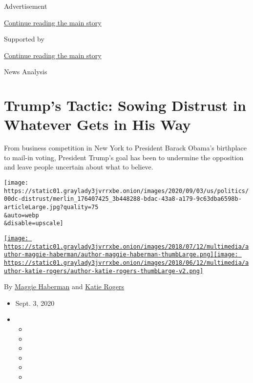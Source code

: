 Advertisement

\protect\hyperlink{after-top}{Continue reading the main story}

Supported by

\protect\hyperlink{after-sponsor}{Continue reading the main story}

News Analysis

\hypertarget{trumps-tactic-sowing-distrust-in-whatever-gets-in-his-way}{%
\section{Trump's Tactic: Sowing Distrust in Whatever Gets in His
Way}\label{trumps-tactic-sowing-distrust-in-whatever-gets-in-his-way}}

From business competition in New York to President Barack Obama's
birthplace to mail-in voting, President Trump's goal has been to
undermine the opposition and leave people uncertain about what to
believe.

\texttt{[image: https://static01.graylady3jvrrxbe.onion/images/2020/09/03/us/politics/00dc-distrust/merlin\_176407425\_3b448288-bdac-43a8-a179-9c63dba6598b-articleLarge.jpg?quality=75\\\&auto=webp\\\&disable=upscale]}

\href{https://www.nytimes3xbfgragh.onion/by/maggie-haberman}{\texttt{[image: https://static01.graylady3jvrrxbe.onion/images/2018/07/12/multimedia/author-maggie-haberman/author-maggie-haberman-thumbLarge.png]}}\href{https://www.nytimes3xbfgragh.onion/by/katie-rogers}{\texttt{[image: https://static01.graylady3jvrrxbe.onion/images/2018/06/12/multimedia/author-katie-rogers/author-katie-rogers-thumbLarge-v2.png]}}

By \href{https://www.nytimes3xbfgragh.onion/by/maggie-haberman}{Maggie
Haberman} and
\href{https://www.nytimes3xbfgragh.onion/by/katie-rogers}{Katie Rogers}

\begin{itemize}
\item
  Sept. 3, 2020
\item
  \begin{itemize}
  \item
  \item
  \item
  \item
  \item
  \item
  \end{itemize}
\end{itemize}


